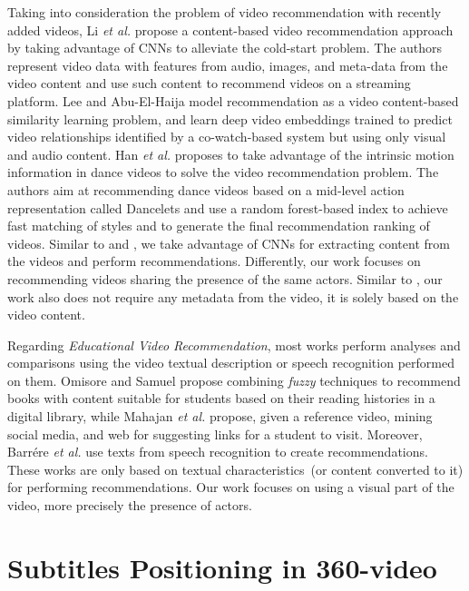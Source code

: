 Taking into consideration the problem of video recommendation with recently added videos, Li \emph{et al.} \cite{li2017study} propose a content-based video recommendation approach by taking advantage of CNNs to alleviate the cold-start problem. The authors represent video data with features from audio, images, and meta-data from the video content and use such content to recommend videos on a streaming platform. Lee and Abu-El-Haija \cite{lee2017large} model recommendation as a video content-based similarity learning problem, and learn deep video embeddings trained to predict video relationships identified by a co-watch-based system but using only visual and audio content. Han \emph{et al.} \cite{han2016dancelets} proposes to take advantage of the intrinsic motion information in dance videos to solve the video recommendation problem. The authors aim at recommending dance videos based on a mid-level action representation called Dancelets and use a random forest-based index to achieve fast matching of styles and to generate the final recommendation ranking of videos. Similar to \cite{li2017study} and \cite{lee2017large}, we take advantage of CNNs for extracting content from the videos and perform recommendations. Differently, our work focuses on recommending videos sharing the presence of the same actors. Similar to \cite{han2016dancelets}, our work also does not require any metadata from the video, it is solely based on the video content.

Regarding \textit{Educational Video Recommendation}, most works perform analyses and comparisons using the video textual description or speech recognition performed on them. Omisore and Samuel \cite{omisore2014personalized} propose combining \textit{fuzzy} techniques to recommend books with content suitable for students based on their reading histories in a digital library, while Mahajan \emph{et al.} \cite{mahajan2015optimising} propose, given a reference video,  mining social media, and web for suggesting links for a student to visit.
Moreover, Barrére \emph{et al.} \cite{barrere2020utilizaccao} use texts from speech recognition to create recommendations.
These works are only based on textual characteristics~(or content converted to it) for performing recommendations.
Our work focuses on using a visual part of the video, more precisely the presence of actors.


\section{Subtitles Positioning in 360-video}
\label{sec:subtitles}

